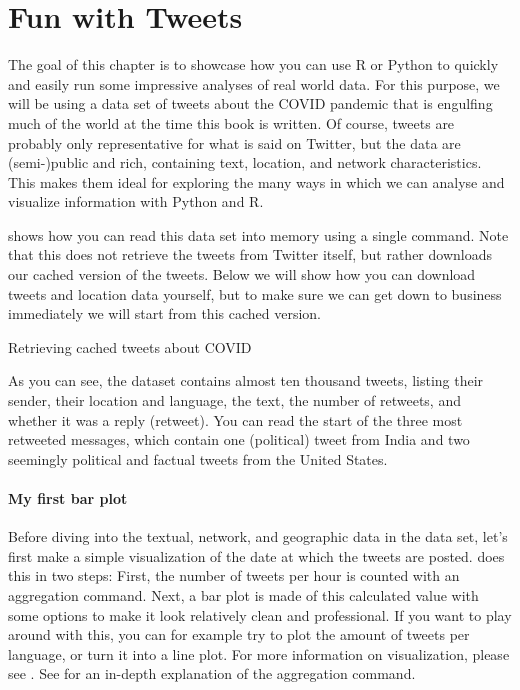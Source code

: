 \section{Fun with Tweets}

The goal of this chapter is to showcase how you can use R or Python to quickly and easily
run some impressive analyses of real world data.
For this purpose, we will be using a data set of tweets about the COVID pandemic that is
engulfing much of the world at the time this book is written.
Of course, tweets are probably only representative for what is said on Twitter,
but the data are (semi-)public and rich, containing text, location, and network characteristics.
This makes them ideal for exploring the many ways in which we can analyse and visualize information
with Python and R. 

 shows how you can read this data set into memory using a single command.
Note that this does not retrieve the tweets from Twitter itself, but rather downloads
our cached version of the tweets.
Below we will show how you can download tweets and location data yourself, but to make sure
we can get down to business immediately we will start from this cached version. 

\begin{ccsexample}
\caption{Retrieving cached tweets about COVID}\label{ex:funtweets}
\end{ccsexample}

As you can see, the dataset contains almost ten thousand tweets, listing their
sender, their location and language, the text, the number of retweets, and whether it was a reply (retweet).
You can read the start of the three most retweeted messages, which contain one (political) tweet from India
and two seemingly political and factual tweets from the United States.

\paragraph{My first bar plot} Before diving into the textual, network, and geographic data in the data set,
let's first make a simple visualization of the date at which the tweets are posted.
 does this in two steps:
First, the number of tweets per hour is counted with an aggregation command.
Next, a bar plot is made of this calculated value with some options to make it look relatively clean and professional.
If you want to play around with this, you can for example try to plot the amount of tweets per language,
or turn it into a line plot. 
For more information on visualization, please see .
See  for an in-depth explanation of the aggregation command. 

